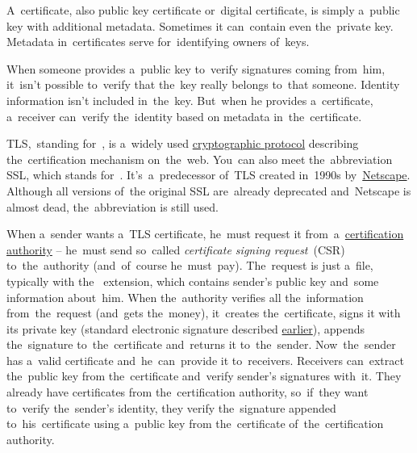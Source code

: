 \label{certificate}
A~certificate, also public key certificate or~digital certificate, is simply a~public key with additional metadata.
Sometimes it can~contain even the~private key.
Metadata in~certificates serve for~identifying owners of~keys.

When someone provides a~public key to~verify signatures coming from~him, it~isn't possible to~verify that the~key really belongs to~that someone.
Identity information isn't included in~the~key.
But~when he provides a~certificate, a~receiver can~verify the~identity based on metadata in~the~certificate.

\label{tls}
TLS,~standing for~, is a~widely used \hyperref[protocolstandard]{cryptographic protocol} describing the~certification mechanism on~the~web.
You~can also meet the~abbreviation SSL, which stands for~.
It's~a~predecessor of~TLS created in~1990s by~\href{https://en.wikipedia.org/wiki/Netscape}{Netscape}.
Although all versions of~the original SSL are~already deprecated and~Netscape is almost dead, the~abbreviation is still used.

When a~sender wants a~TLS certificate, he~must request it from~a~\hyperref[certificationauthority]{certification authority} -- he~must send so~called \textit{certificate signing request}~(CSR) to~the~authority (and~of~course he~must~pay).
The~request is just a~file, typically with the~ extension, which contains sender's public key and~some information about~him.
When the~authority verifies all the~information from~the~request (and~gets the~money), it~creates the~certificate, signs it with its private key (standard electronic signature described \hyperref[electronicsignature]{earlier}), appends the~signature to~the~certificate and~returns it to~the~sender.
Now~the~sender has a~valid certificate and~he~can~provide it to~receivers.
Receivers can~extract the~public key from the~certificate and~verify sender's signatures with~it.
They already have certificates from the~certification authority, so~if~they want to~verify the~sender's identity, they verify the~signature appended to~his~certificate using a~public key from the~certificate of~the~certification authority.

